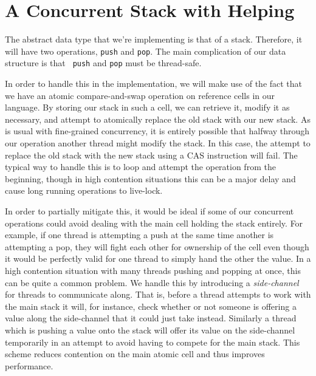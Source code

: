 \section{A Concurrent Stack with Helping}

The abstract data type that we're implementing is that of a
stack. Therefore, it will have two operations, {\tt push} and
{\tt pop}. The main complication of our data structure is that {\tt
  push} and {\tt pop} must be thread-safe.

In order to handle this in the implementation, we will make use of the
fact that we have an atomic compare-and-swap operation on
reference cells in our language. By storing our stack in such a cell,
we can retrieve it, modify it as necessary, and attempt to atomically
replace the old stack with our new stack. As is usual with
fine-grained concurrency, it is entirely possible that halfway
through our operation another thread might modify the stack. In this
case, the attempt to replace the old stack with the new stack using a
CAS instruction will fail. The typical way to handle this is to loop
and attempt the operation from the beginning, though in high
contention situations this can be a major delay and cause long running
operations to live-lock.

In order to partially mitigate this, it would be ideal if some of our
concurrent operations could avoid dealing with the main cell holding
the stack entirely. For example, if one thread is attempting a push at
the same time another is attempting a pop, they will fight each other
for ownership of the cell even though it would be perfectly valid for
one thread to simply hand the other the value. In a high contention
situation with many threads pushing and popping at once, this can be
quite a common problem. We handle this by introducing a
\emph{side-channel} for threads to communicate along. That is, before
a thread attempts to work with the main stack it will, for instance,
check whether or not someone is offering a value along the
side-channel that it could just take instead. Similarly a thread which
is pushing a value onto the stack will offer its value on the
side-channel temporarily in an attempt to avoid having to compete for
the main stack. This scheme reduces contention on the main atomic cell
and thus improves performance.

